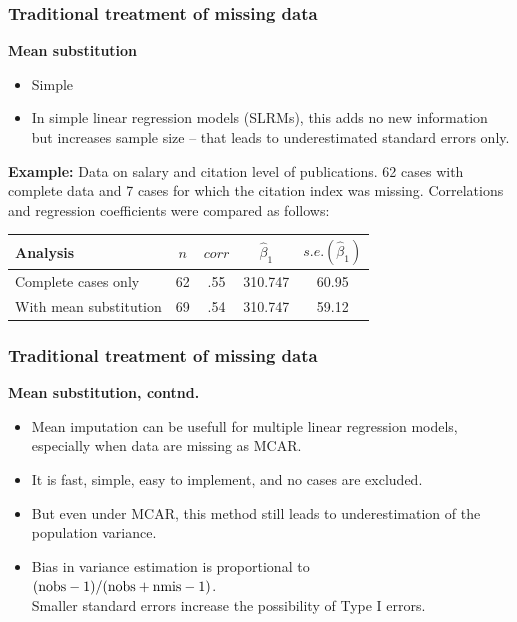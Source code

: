\documentclass{beamer}
\begin{document}
\begin{frame}
\frametitle{Traditional treatment of missing data}
\textbf{Mean substitution}
\vspace{0.2cm}
  \begin{itemize}
  \item[\ding{51}] Simple
  \item[\ding{55}] In simple linear regression models (SLRMs), this adds no new information but increases sample size – that leads to underestimated standard errors only.
  \end{itemize} 
  \vspace{0.2cm}
\textbf{Example:} Data on salary and citation level of publications. 62 cases with complete data and 7 cases for which the citation index was missing. Correlations and regression coefficients were compared as follows:

\begin{table}
\begin{tabular}{l c c c c}
\toprule
Analysis & $n$ & $corr$ & $\widehat{\beta}_1$ & $\textit{s.e.}(\widehat{\beta}_1)$\\
\midrule
Complete cases only & 62 & .55 &  310.747 & 60.95 \\
With mean substitution & 69 & .54 &  310.747 & 59.12 \\
\bottomrule
\end{tabular}
\end{table}
\end{frame}
\begin{frame}
\frametitle{Traditional treatment of missing data}
\textbf{Mean substitution, contnd.} \\
\medskip
\begin{itemize}
    \item Mean imputation can be usefull for multiple linear regression models, especially when data are missing as MCAR.
    \smallskip
    \item It is fast, simple, easy to implement, and no cases are excluded.
    \bigskip
    \item But even under MCAR, this method still leads to underestimation of the population variance. 
    \smallskip
    \item Bias in variance estimation is proportional to \\
    $( \textnormal{nobs} - 1)/( \textnormal{nobs} + \textnormal{nmis} - 1)$. \\Smaller standard errors increase the possibility of Type I errors.
\end{itemize}
\end{frame}
\end{document}
